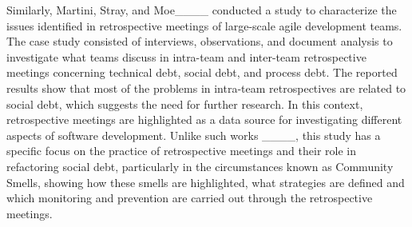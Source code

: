 Similarly, Martini, Stray, and Moe____ conducted a study to characterize the issues identified in retrospective meetings of large-scale agile development teams. The case study consisted of interviews, observations, and document analysis to investigate what teams discuss in intra-team and inter-team retrospective meetings concerning technical debt, social debt, and process debt. The reported results show that most of the problems in intra-team retrospectives are related to social debt, which suggests the need for further research.
In this context, retrospective meetings are highlighted as a data source for investigating different aspects of software development. Unlike such works ____, this study has a specific focus on the practice of retrospective meetings and their role in refactoring social debt, particularly in the circumstances known as Community Smells, showing how these smells are highlighted, what strategies are defined and which monitoring and prevention are carried out through the retrospective meetings.